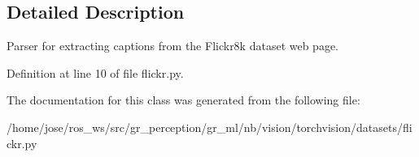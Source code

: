 \subsection{Detailed Description}
\begin{DoxyVerb}Parser for extracting captions from the Flickr8k dataset web page.\end{DoxyVerb}
 

Definition at line 10 of file flickr.\+py.



The documentation for this class was generated from the following file\+:\begin{DoxyCompactItemize}
\item 
/home/jose/ros\+\_\+ws/src/gr\+\_\+perception/gr\+\_\+ml/nb/vision/torchvision/datasets/flickr.\+py\end{DoxyCompactItemize}
